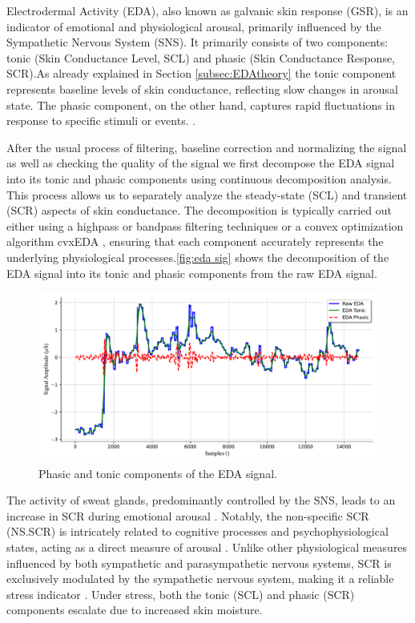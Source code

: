 Electrodermal Activity (EDA), also known as galvanic skin response (GSR), is an indicator of emotional and physiological arousal, primarily influenced by the Sympathetic Nervous System (SNS). It primarily consists of two components: tonic (Skin Conductance Level, SCL) and phasic (Skin Conductance Response, SCR).As already explained in Section \ref*{subsec:EDAtheory} the tonic component represents baseline levels of skin conductance, reflecting slow changes in arousal state. The phasic component, on the other hand, captures rapid fluctuations in response to specific stimuli or events. \textcite{electrodermal}.

After the usual process of filtering, baseline correction and normalizing the signal as well as checking the quality of the signal we first decompose the EDA signal into its tonic and phasic components using continuous decomposition analysis. This process allows us to separately analyze the steady-state (SCL) and transient (SCR) aspects of skin conductance.
The decomposition is typically carried out either using a highpass or bandpass filtering techniques or a convex optimization algorithm cvxEDA \parencite{cvxEDA} , ensuring that each component accurately represents the underlying physiological processes.\autoref*{fig:eda sig} shows the decomposition of the EDA signal into its tonic and phasic components from the raw EDA signal.

\begin{figure}[!htbp]
	\centering
	\includegraphics[width=\columnwidth]{images/edaplot.pdf}
	\caption{Phasic and tonic components of the EDA signal.}
	\label{fig:eda sig}
\end{figure}

The activity of sweat glands, predominantly controlled by the SNS, leads to an increase in SCR during emotional arousal \parencite{electrodermal}. Notably, the non-specific SCR (NS.SCR) is intricately related to cognitive processes and psychophysiological states, acting as a direct measure of arousal \parencite{177}. Unlike other physiological measures influenced by both sympathetic and parasympathetic nervous systems, SCR is exclusively modulated by the sympathetic nervous system, making it a reliable stress indicator \parencite{7}. Under stress, both the tonic (SCL) and phasic (SCR) components escalate due to increased skin moisture.

